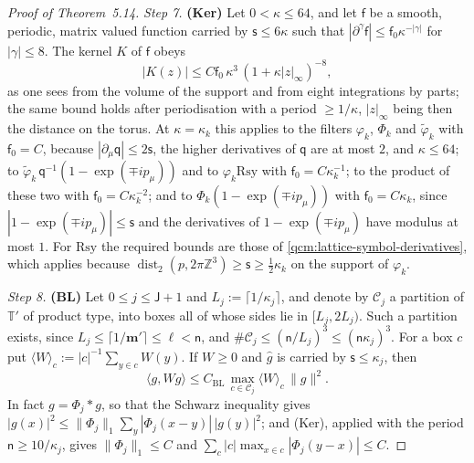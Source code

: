 \documentclass[11pt,letterpaper,reqno]{amsart}
\theoremstyle{definition}
\begin{document}
\begin{proof}[Proof of Theorem~5.14]
\emph{Step 7.}
\textbf{(Ker)} Let $0<\kappa\le64$, and let $\mathsf f$ be a smooth, periodic, matrix valued function carried by $\mathsf s\le6\kappa$ such that $|\partial^\gamma\mathsf f|\le\mathsf f_0\kappa^{-|\gamma|}$ for $|\gamma|\le8$.
The kernel $K$ of $\mathsf f$ obeys
\begin{equation*}
|K(z)|\le C\mathsf f_0\,\kappa^3\,(1+\kappa|z|_\infty)^{-8},
\end{equation*}
as one sees from the volume of the support and from eight integrations by parts;
the same bound holds after periodisation with a period $\ge1/\kappa$, $|z|_\infty$ being then the distance on the torus.
At $\kappa=\kappa_k$ this applies to the filters $\varphi_k$, $\Phi_k$ and $\tilde\varphi_k$ with $\mathsf f_0=C$, because $|\partial_\mu\mathsf q|\le2\mathsf s$, the higher derivatives of $\mathsf q$ are at most $2$, and $\kappa\le64$;
to $\tilde\varphi_k\,\mathsf q^{-1}(1-\exp(\mp ip_\mu))$ and to $\varphi_k\mathrm{Rsy}$ with $\mathsf f_0=C\kappa_k^{-1}$;
to the product of these two with $\mathsf f_0=C\kappa_k^{-2}$;
and to $\Phi_k(1-\exp(\mp ip_\mu))$ with $\mathsf f_0=C\kappa_k$, since $|1-\exp(\mp ip_\mu)|\le\mathsf s$ and the derivatives of $1-\exp(\mp ip_\mu)$ have modulus at most $1$.
For $\mathrm{Rsy}$ the required bounds are those of \eqref{qcm:lattice-symbol-derivatives}, which applies because $\operatorname{dist}_2(p,\allowbreak 2\pi\mathbb Z^3)\ge\mathsf s\ge\frac12\kappa_k$ on the support of $\varphi_k$.

\emph{Step 8.}
\textbf{(BL)} Let $0\le j\le\mathsf J+1$ and $L_j:=\lceil1/\kappa_j\rceil$, and denote by $\mathcal C_j$ a partition of $\mathbb T'$ of product type, into boxes all of whose sides lie in $[L_j,2L_j)$.
Such a partition exists, since $L_j\le\lceil1/\mathbf m'\rceil\le\ell<\mathsf n$, and $\#\mathcal C_j\le(\mathsf n/L_j)^3\le(\mathsf n\kappa_j)^3$.
For a box $c$ put $\langle W\rangle_c:=|c|^{-1}\sum_{y\in c}W(y)$.
If $W\ge0$ and $\hat g$ is carried by $\mathsf s\le\kappa_j$, then
\begin{equation*}
\langle g,Wg\rangle\le C_{\mathrm{BL}}\,\max_{c\in\mathcal C_j}\langle W\rangle_c\,\|g\|^2.
\end{equation*}
In fact $g=\Phi_j*g$, so that the Schwarz inequality gives $|g(x)|^2\le\|\Phi_j\|_1\sum_y|\Phi_j(x-y)|\,|g(y)|^2$;
and (Ker), applied with the period $\mathsf n\ge10/\kappa_j$, gives $\|\Phi_j\|_1\le C$ and $\sum_c|c|\max_{x\in c}|\Phi_j(y-x)|\le C$.


\end{proof}
\end{document}
